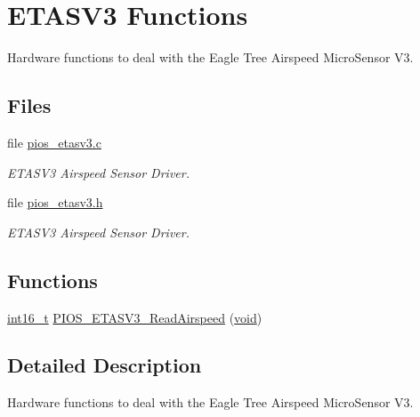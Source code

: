\hypertarget{group___p_i_o_s___e_t_a_s_v3}{\section{E\-T\-A\-S\-V3 Functions}
\label{group___p_i_o_s___e_t_a_s_v3}
}


Hardware functions to deal with the Eagle Tree Airspeed Micro\-Sensor V3.  


\subsection*{Files}
\begin{DoxyCompactItemize}
\item 
file \hyperlink{pios__etasv3_8c}{pios\-\_\-etasv3.\-c}
\begin{DoxyCompactList}\small\item\em E\-T\-A\-S\-V3 Airspeed Sensor Driver. \end{DoxyCompactList}\item 
file \hyperlink{pios__etasv3_8h}{pios\-\_\-etasv3.\-h}
\begin{DoxyCompactList}\small\item\em E\-T\-A\-S\-V3 Airspeed Sensor Driver. \end{DoxyCompactList}\end{DoxyCompactItemize}
\subsection*{Functions}
\begin{DoxyCompactItemize}
\item 
\hyperlink{stdint_8h_aa343fa3b3d06292b959ffdd4c4703b06}{int16\-\_\-t} \hyperlink{group___p_i_o_s___e_t_a_s_v3_ga31f2503f2dd42f823565acc582c50175}{P\-I\-O\-S\-\_\-\-E\-T\-A\-S\-V3\-\_\-\-Read\-Airspeed} (\hyperlink{group___n_a_m_e_ga18028b8badbf1ea7e704ccac3c488e82}{void})
\end{DoxyCompactItemize}


\subsection{Detailed Description}
Hardware functions to deal with the Eagle Tree Airspeed Micro\-Sensor V3. 

